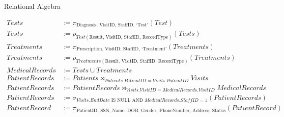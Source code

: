 \documentclass[11pt, letterpaper]{article}
\begin{document}
    Relational Algebra

    \begin{align*}
        Tests          & := \pi_{\text{Diagnosis, VisitID, StaffID, `Test'}}(Test) \\
        Tests          & := \rho_{Test(\text{Result, VisitID, StaffID, RecordType})}(Tests) \\
        Treatments     & := \pi_{\text{Prescription, VisitID, StaffID, `Treatment'}}(Treatments) \\
        Treatments     & := \rho_{Treatments(\text{Result, VisitID, StaffID, RecordType})}(Treatments) \\
        MedicalRecords & := Tests \cup Treatments \\
        PatientRecords & := Patients \Join_{Patients.PatientID = Visits.PatientID} Visits \\
        PatientRecords & := PatientRecords \Join_{Visits.VisitID = MedicalRecords.VisitID} MedicalRecords \\
        PatientRecords & := \sigma_{Visits.EndDate \text{ IS NULL AND } MedicalRecords.StaffID = 1}(PatientRecords) \\
        PatientRecord  & := \pi_{\text{PatientID, SSN, Name, DOB, Gender, PhoneNumber, Address, Status}}(PatientRecord) \\
    \end{align*}
\end{document}
